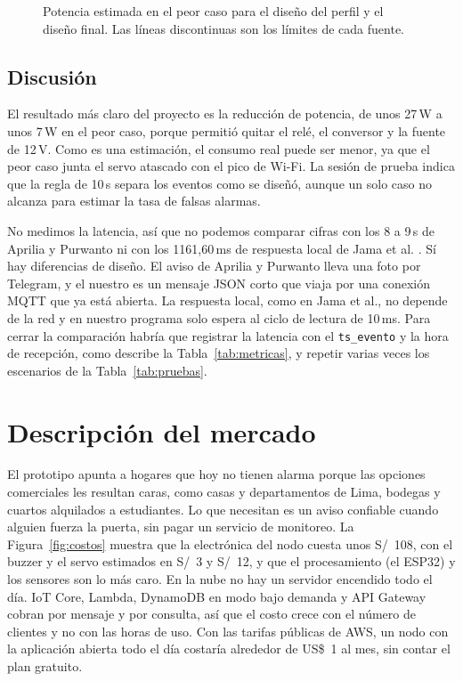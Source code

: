 \documentclass[manuscript,screen,nonacm]{acmart}
\begin{document}
\begin{figure}[htbp]
\centering

\caption{Potencia estimada en el peor caso para el diseño del perfil y el diseño final. Las líneas discontinuas son los límites de cada fuente.}
\label{fig:corriente}
\end{figure}

\subsection{Discusión}
El resultado más claro del proyecto es la reducción de potencia, de unos 27\,W a unos 7\,W en el peor caso, porque permitió quitar el relé, el conversor y la fuente de 12\,V. Como es una estimación, el consumo real puede ser menor, ya que el peor caso junta el servo atascado con el pico de Wi-Fi. La sesión de prueba indica que la regla de 10\,s separa los eventos como se diseñó, aunque un solo caso no alcanza para estimar la tasa de falsas alarmas.

No medimos la latencia, así que no podemos comparar cifras con los 8 a 9\,s de Aprilia y Purwanto \cite{aprilia2025boarding} ni con los 1161,60\,ms de respuesta local de Jama et al. \cite{jama2026edge}. Sí hay diferencias de diseño. El aviso de Aprilia y Purwanto lleva una foto por Telegram, y el nuestro es un mensaje JSON corto que viaja por una conexión MQTT que ya está abierta. La respuesta local, como en Jama et al., no depende de la red y en nuestro programa solo espera al ciclo de lectura de 10\,ms. Para cerrar la comparación habría que registrar la latencia con el \texttt{ts\_evento} y la hora de recepción, como describe la Tabla~\ref{tab:metricas}, y repetir varias veces los escenarios de la Tabla~\ref{tab:pruebas}.

\section{Descripción del mercado}
\label{sec:mercado}

El prototipo apunta a hogares que hoy no tienen alarma porque las opciones comerciales les resultan caras, como casas y departamentos de Lima, bodegas y cuartos alquilados a estudiantes. Lo que necesitan es un aviso confiable cuando alguien fuerza la puerta, sin pagar un servicio de monitoreo. La Figura~\ref{fig:costos} muestra que la electrónica del nodo cuesta unos S/~108, con el buzzer y el servo estimados en S/~3 y S/~12, y que el procesamiento (el ESP32) y los sensores son lo más caro. En la nube no hay un servidor encendido todo el día. IoT Core, Lambda, DynamoDB en modo bajo demanda y API Gateway cobran por mensaje y por consulta, así que el costo crece con el número de clientes y no con las horas de uso. Con las tarifas públicas de AWS, un nodo con la aplicación abierta todo el día costaría alrededor de US\$~1 al mes, sin contar el plan gratuito.
\end{document}
